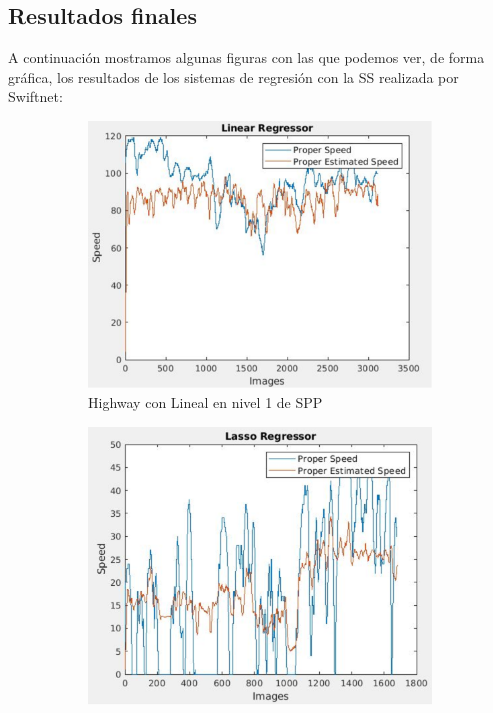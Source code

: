 \subsection{Resultados finales}

A continuación mostramos algunas figuras con las que podemos ver, de forma gráfica, los resultados de los sistemas de regresión con la \ac{SS} realizada por Swiftnet:

\begin{figure}[H]
  \centering
  \begin{subfigure}[b]{0.45\linewidth}
    \includegraphics[width=\linewidth]{Figuras/Lineal_Highway(Nivel_1).eps}
    \caption{Highway con Lineal en nivel 1 de \ac{SPP}}
  \end{subfigure}
    \begin{subfigure}[b]{0.425\linewidth}
    \includegraphics[width=\linewidth]{Figuras/Lasso_Urban(Nivel_1).eps}

\end{subfigure}
\end{figure}
